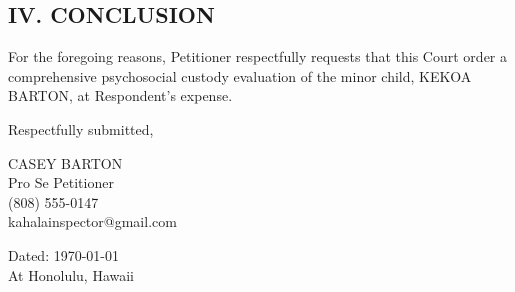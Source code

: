 \documentclass[11pt,letter]{article}
\begin{document}
\subsection*{IV. CONCLUSION}

For the foregoing reasons, Petitioner respectfully requests that this Court order a comprehensive psychosocial custody evaluation of the minor child, KEKOA BARTON, at Respondent's expense.

\vspace{0.5cm}

Respectfully submitted,

\vspace{1.5cm}

CASEY BARTON \\
Pro Se Petitioner \\
(808) 555-0147 \\
kahalainspector@gmail.com

\vspace{0.5cm}

Dated: \today{} \\
At Honolulu, Hawaii
\end{document}
